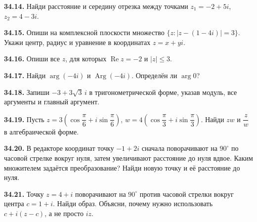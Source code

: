 \noindent\begin{minipage}[t]{\linewidth}\textbf{34.14.} Найди расстояние и середину отрезка между точками \(z_1=-2+5i\), \(z_2=4-3i\).\par\end{minipage}\par
\noindent\begin{minipage}[t]{\linewidth}\textbf{34.15.} Опиши на комплексной плоскости множество \(\{z:|z-(1-4i)|=3\}\). Укажи центр, радиус и уравнение в координатах \(z=x+yi\).\par\end{minipage}\par
\noindent\begin{minipage}[t]{\linewidth}\textbf{34.16.} Опиши все \(z\), для которых \(\operatorname{Re}z=-2\) и \(|z|\le3\).\par\end{minipage}\par
\noindent\begin{minipage}[t]{\linewidth}\textbf{34.17.} Найди \(\arg(-4i)\) и \(\operatorname{Arg}(-4i)\). Определён ли \(\arg0\)?\par\end{minipage}\par
\noindent\begin{minipage}[t]{\linewidth}\textbf{34.18.} Запиши \(-3+3\sqrt3\,i\) в тригонометрической форме, указав модуль, все аргументы и главный аргумент.\par\end{minipage}\par
\noindent\begin{minipage}[t]{\linewidth}\textbf{34.19.} Пусть \(z=3(\cos\dfrac\pi6+i\sin\dfrac\pi6)\), \(w=4(\cos\dfrac\pi3+i\sin\dfrac\pi3)\). Найди \(zw\) и \(\dfrac zw\) в алгебраической форме.\par\end{minipage}\par
\noindent\begin{minipage}[t]{\linewidth}\textbf{34.20.} В редакторе координат точку \(-1+2i\) сначала поворачивают на \(90^\circ\) по часовой стрелке вокруг нуля, затем увеличивают расстояние до нуля вдвое. Каким множителем задаётся преобразование? Найди новую точку и её расстояние до нуля.\par\end{minipage}\par
\noindent\begin{minipage}[t]{\linewidth}\textbf{34.21.} Точку \(z=4+i\) поворачивают на \(90^\circ\) против часовой стрелки вокруг центра \(c=1+i\). Найди образ. Объясни, почему нужно использовать \(c+i(z-c)\), а не просто \(iz\).\par\end{minipage}\par

